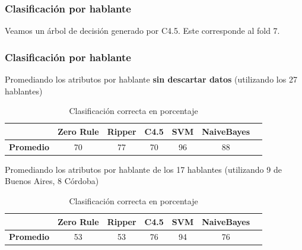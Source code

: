 \documentclass[mathserif]{beamer}%
\begin{document}
\begin{frame}[noframenumbering]
	\frametitle{Clasificación por hablante}
	
	Veamos un árbol de decisión generado por C4.5. Este corresponde al fold 7. 
	
		
\end{frame}

\begin{frame}[noframenumbering]
	\frametitle{Clasificación por hablante}
	
	Promediando los atributos por hablante \textbf{sin descartar datos} (utilizando los 27 hablantes)
	
	{\small 	
		\begin{table}[H]
			\centering
			\begin{tabular}{|l|c|c|c|c|c|c|}
				\hline
				\textbf{}  & \textbf{Zero Rule} & \textbf{Ripper} & \textbf{C4.5} & \textbf{SVM} & \textbf{NaiveBayes} \\ \hline
				\textbf{Promedio} & 70  & 77 & 70 & 96 & 88 \\ \hline
			\end{tabular}
			\caption{Clasificación correcta en porcentaje}
			\label{HPTDT_clas_xval_porHab}
		\end{table}
	}
	
	Promediando los atributos por hablante de los 17 hablantes
	(utilizando 9 de Buenos Aires, 8 Córdoba)
	
	{\small 	
		\begin{table}[H]
			\centering
			\begin{tabular}{|l|c|c|c|c|c|c|}
				\hline
				\textbf{}  & \textbf{Zero Rule} & \textbf{Ripper} & \textbf{C4.5} & \textbf{SVM} & \textbf{NaiveBayes} \\ \hline
				\textbf{Promedio} & 53  & 53 & 76 & 94 & 76 \\ \hline
			\end{tabular}
			\caption{Clasificación correcta en porcentaje}
			\label{HPTDT_clas_xval_porHab}
		\end{table}
	}
	
\end{frame}
\end{document}

